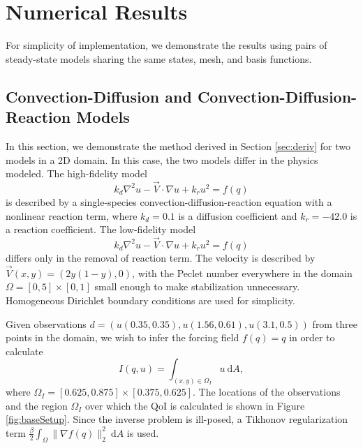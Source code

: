 \chapter{Numerical Results}

For simplicity of implementation, we demonstrate the results using pairs of steady-state models sharing the same states, mesh, and basis functions.

\section{Convection-Diffusion and Convection-Diffusion-Reaction Models}  %

In this section, we demonstrate the method derived in Section \ref{sec:deriv} for two models in a 2D domain. In this case, the two models differ in the physics modeled. The high-fidelity model 
\begin{equation}
k_d\nabla^2 u - \vec{V}\cdot\nabla u + k_ru^2= f(q)
\end{equation}
is described by a single-species convection-diffusion-reaction equation with a nonlinear reaction term, where $k_d = 0.1$ is a diffusion coefficient and $k_r = -42.0$ is a reaction coefficient. The low-fidelity model
\begin{equation}
k_d\nabla^2 u - \vec{V}\cdot\nabla u + k_ru^2= f(q)
\end{equation}
differs only in the removal of reaction term. The velocity is described by $\vec{V}(x,y) = (2y(1-y),0)$, with the Peclet number everywhere in the domain $\Omega=[0,5]\times[0,1]$ small enough to make stabilization unnecessary. Homogeneous Dirichlet boundary conditions are used for simplicity. 

Given observations $d=(u(0.35,0.35),u(1.56,0.61),u(3.1,0.5))$ from three points in the domain, we wish to infer the forcing field $f(q)=q$ in order to calculate
\begin{equation}
I(q,u)=\int_{(x,y)\in \Omega_I} u \:\textrm{d}A,
\end{equation}
where $\Omega_I=[0.625,0.875]\times[0.375,0.625]$. The locations of the observations and the region $\Omega_I$ over which the QoI is calculated is shown in Figure \ref{fig:baseSetup}. Since the inverse problem is ill-posed, a Tikhonov regularization term $\frac{\beta}{2}\int_\Omega \|\nabla f(q)\|_2^2\:\textrm{d}A$ is used.

